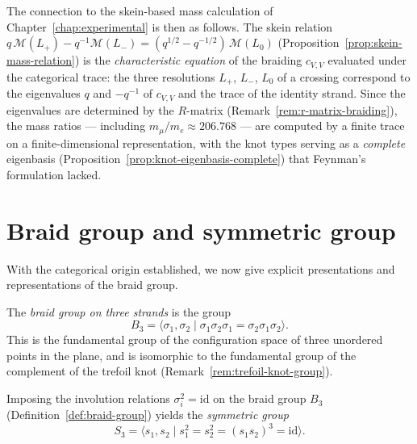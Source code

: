 \begin{remark}
The connection to the skein-based mass calculation of
Chapter~\ref{chap:experimental} is then as follows.  The skein relation
$q\,\mathcal{M}(L_+) - q^{-1}\mathcal{M}(L_-) =
(q^{1/2} - q^{-1/2})\,\mathcal{M}(L_0)$
(Proposition~\ref{prop:skein-mass-relation}) is the
\emph{characteristic equation} of the braiding $c_{V,V}$ evaluated under
the categorical trace: the three resolutions $L_+$, $L_-$, $L_0$ of a
crossing correspond to the eigenvalues $q$ and $-q^{-1}$ of $c_{V,V}$
and the trace of the identity strand.  Since the eigenvalues are
determined by the $R$-matrix (Remark~\ref{rem:r-matrix-braiding}), the
mass ratios --- including $m_\mu/m_e \approx 206.768$ --- are computed by
a finite trace on a finite-dimensional representation, with the knot types
serving as a \emph{complete} eigenbasis
(Proposition~\ref{prop:knot-eigenbasis-complete}) that Feynman's
formulation lacked.
\end{remark}


\section{Braid group and symmetric group}
\label{sec:braid-symmetric}

With the categorical origin established, we now give explicit presentations
and representations of the braid group.

\begin{definition}
\label{def:braid-group}
The \emph{braid group on three strands} is the group
\begin{equation}\label{eq:braid-presentation}
  B_3
  =\bigl\langle\sigma_1,\sigma_2
    \;\big|\;\sigma_1\sigma_2\sigma_1=\sigma_2\sigma_1\sigma_2\bigr\rangle.
\end{equation}
This is the fundamental group of the configuration space of three
unordered points in the plane, and is isomorphic to the fundamental group
of the complement of the trefoil knot
(Remark~\ref{rem:trefoil-knot-group}).
\end{definition}

\begin{definition}
\label{def:s3-group}
Imposing the involution relations $\sigma_i^2=\mathrm{id}$ on the braid
group $B_3$ (Definition~\ref{def:braid-group}) yields the
\emph{symmetric group}
\begin{equation}\label{eq:s3-presentation}
  S_3
  =\bigl\langle s_1,s_2
    \;\big|\;s_1^2=s_2^2=(s_1 s_2)^3=\mathrm{id}\bigr\rangle.
\end{equation}
\end{definition}

